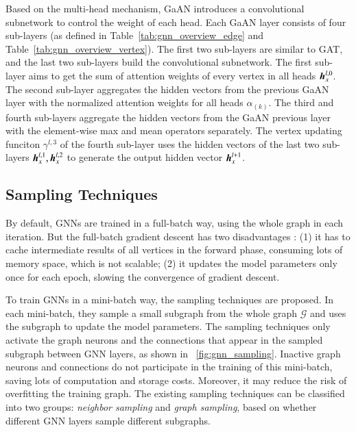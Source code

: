 Based on the multi-head mechanism, GaAN \cite{zhang2018_gaan} introduces a convolutional subnetwork to control the weight of each head.
%
Each GaAN layer consists of four sub-layers (as defined in Table~\ref{tab:gnn_overview_edge} and Table~\ref{tab:gnn_overview_vertex}).
%
The first two sub-layers are similar to GAT, and the last two sub-layers build the convolutional subnetwork.
%
The first sub-layer aims to get the sum of attention weights of every vertex in all heads $\boldsymbol{h}^{l,0}_x$.
The second sub-layer aggregates the hidden vectors from the previous GaAN layer with the normalized attention weights for all heads $\alpha_{(k)}$.
The third and fourth sub-layers aggregate the hidden vectors from the GaAN previous layer with the element-wise max and mean operators separately.
The vertex updating funciton $\gamma^{l,3}$ of the fourth sub-layer uses the hidden vectors of the last two sub-layers $\boldsymbol{h}^{l, 1}_x, \boldsymbol{h}^{l, 2}_x$ to generate the output hidden vector $\boldsymbol{h}^{l+1}_x$.

\subsection{Sampling Techniques}

By default, GNNs are trained in a full-batch way, using the whole graph in each iteration.
%
But the full-batch gradient descent has two disadvantages \cite{chiang2019_cluster_gcn}:
%
(1) it has to cache intermediate results of all vertices in the forward phase, consuming lots of memory space, which is not scalable;
%
(2) it updates the model parameters only once for each epoch, slowing the convergence of gradient descent.

To train GNNs in a mini-batch way, the sampling techniques \cite{hamilton2017_graphsage, ying2018_pinsage, chen2018_fastgcn, chen2018_sgcn, zeng2018_aesg, chiang2019_cluster_gcn, zeng2020_graphsaint} are proposed.
%
In each mini-batch, they sample a small subgraph from the whole graph $\mathcal{G}$ and uses the subgraph to update the model parameters.
%
The sampling techniques only activate the graph neurons and the connections that appear in the sampled subgraph between GNN layers, as shown in \figurename~\ref{fig:gnn_sampling}.
%
Inactive graph neurons and connections do not participate in the training of this mini-batch, saving lots of computation and storage costs.
%
Moreover, it may reduce the risk of overfitting the training graph.
%
The existing sampling techniques can be classified into two groups: \emph{neighbor sampling} and \emph{graph sampling}, based on whether different GNN layers sample different subgraphs.


